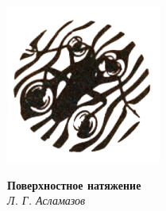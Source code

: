\documentclass{article}
\begin{document}
\noindent\makebox[\linewidth]{\rule{21cm}{0.4pt}}
\begin{multicols}{3}
\begin{flushright}
\vspace*{\fill}
\includegraphics[scale=0.5]{title.png}
\vspace*{\fill}
\end{flushright}
\vspace*{\fill}
\begin{flushleft}
\Huge
\textbf{Поверхностное натяжение}\\
\Large
\textit{Л. Г. Асламазов}    
\end{flushleft}
\vspace*{\fill}
\end{multicols}
\noindent\makebox[\linewidth]{\rule{21cm}{0.4pt}}
\end{document}
